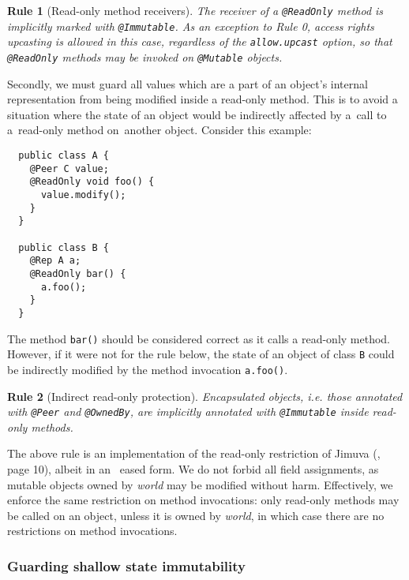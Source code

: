 \documentclass{pracamgr}
\theoremstyle{break}
\theoremstyle{break}
\theoremstyle{break}
\newtheorem{verrule}{Rule}
\begin{document}
\begin{verrule}[Read-only method receivers] \label{vrl:readonly:rec}
  The receiver of a \texttt{@ReadOnly} method is implicitly marked
  with \texttt{@Immutable}. As an exception to Rule 0, access rights
  upcasting is allowed in this case, regardless of the
  \texttt{allow.upcast} option, so that \texttt{@ReadOnly} methods may
  be invoked on \texttt{@Mutable} objects.
\end{verrule}

Secondly, we must guard all values which are a part of an object's
internal representation from being modified inside a read-only
method. This is to avoid a situation where the state of an object
would be indirectly affected by a~call to a~read-only method
on~another object. Consider this example:

\begin{lstlisting}
  public class A {
    @Peer C value;
    @ReadOnly void foo() {
      value.modify(); 
    }
  }

  public class B {
    @Rep A a;
    @ReadOnly bar() {
      a.foo();
    }
  }
\end{lstlisting}

The method \texttt{bar()} should be considered correct as it calls a
read-only method. However, if it were not for the rule below, the
state of an object of class \texttt{B} could be indirectly modified 
by the method invocation \texttt{a.foo()}. 

\begin{verrule}[Indirect read-only
  protection] \label{vrl:readonly:meth} Encapsulated objects,
  i.e. those annotated with \texttt{@Peer} and \texttt{@OwnedBy}, are
  implicitly annotated with \texttt{@Immutable} inside read-only
  methods.
\end{verrule}

The above rule is an implementation of the read-only restriction of
Jimuva (\cite{haack}, page 10), albeit in an~ eased form. We do not
forbid all field assignments, as mutable objects owned by \emph{world}
may be modified without harm. Effectively, we enforce the same
restriction on method invocations: only read-only methods may be
called on an object, unless it is owned by \emph{world}, in which case
there are no restrictions on method invocations.

\subsubsection{Guarding shallow state immutability} 
\end{document}
